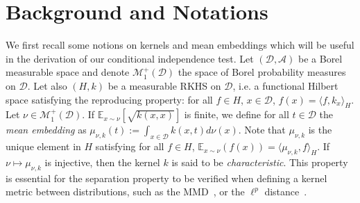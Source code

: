 

\section{Background and Notations}
We first recall some notions on kernels and mean embeddings which will be useful in the derivation of our conditional independence test.
Let $(\mathcal{D},\mathcal{A})$ be a Borel measurable space and denote $\mathcal{M}_{1}^{+}(\mathcal{D})$ the space of Borel probability measures on $\mathcal{D}$. Let also $(H,k)$ be a measurable RKHS  on $\mathcal{D}$, i.e. a functional Hilbert space satisfying the reproducing property: for all $f\in H$, $x\in\mathcal{D}$, $f(x)=\langle f,k_x\rangle_H$. Let $\nu\in\mathcal{M}_{1}^{+}(\mathcal{D})$. If $\mathbb{E}_{x\sim\nu}[\sqrt{k(x,x)}]$ is finite, we define for all $t\in\mathcal{D}$ the \emph{mean embedding} as $\mu_{\nu,k}(t):=\int_{x\in\mathcal{D}}k(x,t)d\nu(x)$.
Note that $\mu_{\nu,k}$ is the unique element in $H$ satisfying for all $f\in H$,  $\mathbb{E}_{x\sim\nu}(f(x))=\langle \mu_{\nu,k},f\rangle_{H}$. If  $\nu\mapsto\mu_{\nu,k}$ is injective, then  the kernel $k$ is said to be \emph{characteristic}. This property is essential for the separation property to be verified when defining a kernel metric between distributions, such as the MMD~\citep{gretton2012kernel}, or the $\ell^p$ distance~\citep{NEURIPS2019_0e2db0cb}. %
